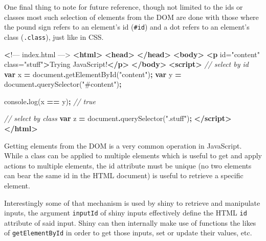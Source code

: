 \documentclass[
]{krantz}
\makeatletter
\newenvironment{Shaded}{\begin{snugshade}}{\end{snugshade}}
\newcommand{\BuiltInTok}[1]{#1}
\newcommand{\CommentTok}[1]{\textcolor[rgb]{0.37,0.37,0.37}{\textit{#1}}}
\newcommand{\ErrorTok}[1]{\textcolor[rgb]{0.14,0.14,0.14}{\textbf{#1}}}
\newcommand{\FunctionTok}[1]{\textcolor[rgb]{0,0,0}{#1}}
\newcommand{\KeywordTok}[1]{\textcolor[rgb]{0.27,0.27,0.27}{\textbf{#1}}}
\newcommand{\NormalTok}[1]{#1}
\newcommand{\OperatorTok}[1]{\textcolor[rgb]{0.43,0.43,0.43}{\textbf{#1}}}
\newcommand{\OtherTok}[1]{\textcolor[rgb]{0.37,0.37,0.37}{#1}}
\newcommand{\StringTok}[1]{\textcolor[rgb]{0.5,0.5,0.5}{#1}}
\newenvironment{kframe}{%
\medskip{}
\setlength{\fboxsep}{.8em}
 \def\at@end@of@kframe{}%
 \ifinner\ifhmode%
  \def\at@end@of@kframe{\end{minipage}}%
  \begin{minipage}{\columnwidth}%
 \fi\fi%
 \def\FrameCommand##1{\hskip\@totalleftmargin \hskip-\fboxsep
 \colorbox{shadecolor}{##1}\hskip-\fboxsep
     \hskip-\linewidth \hskip-\@totalleftmargin \hskip\columnwidth}%
 \MakeFramed {\advance\hsize-\width
   \@totalleftmargin\z@ \linewidth\hsize
   \@setminipage}}%
 {\par\unskip\endMakeFramed%
 \at@end@of@kframe}
\renewenvironment{Shaded}{\begin{kframe}}{\end{kframe}}
\makeatother
\begin{document}
One final thing to note for future reference, though not limited to the ids or classes most such selection of elements from the DOM are done with those where the pound sign refers to an element's id (\texttt{\#id}) and a dot refers to an element's class (\texttt{.class}), just like in CSS.

\begin{Shaded}
\begin{Highlighting}[]
 \ErrorTok{\textless{}}\NormalTok{!–– index.html ––\textgreater{}}
\KeywordTok{\textless{}html\textgreater{}}
  \KeywordTok{\textless{}head\textgreater{}}
  \KeywordTok{\textless{}/head\textgreater{}}
  \KeywordTok{\textless{}body\textgreater{}}
    \KeywordTok{\textless{}p}\OtherTok{ id=}\StringTok{"content"}\OtherTok{ class=}\StringTok{"stuff"}\KeywordTok{\textgreater{}}\NormalTok{Trying JavaScript!}\KeywordTok{\textless{}/p\textgreater{}}
  \KeywordTok{\textless{}/body\textgreater{}}
  \KeywordTok{\textless{}script\textgreater{}}
    \CommentTok{// select by id}
    \KeywordTok{var}\NormalTok{ x }\OperatorTok{=} \BuiltInTok{document}\OperatorTok{.}\FunctionTok{getElementById}\NormalTok{(}\StringTok{"content"}\NormalTok{)}\OperatorTok{;}
    \KeywordTok{var}\NormalTok{ y }\OperatorTok{=} \BuiltInTok{document}\OperatorTok{.}\FunctionTok{querySelector}\NormalTok{(}\StringTok{"\#content"}\NormalTok{)}\OperatorTok{;}

    \BuiltInTok{console}\OperatorTok{.}\FunctionTok{log}\NormalTok{(x }\OperatorTok{==}\NormalTok{ y)}\OperatorTok{;} \CommentTok{// true}

    \CommentTok{// select by class}
    \KeywordTok{var}\NormalTok{ z }\OperatorTok{=} \BuiltInTok{document}\OperatorTok{.}\FunctionTok{querySelector}\NormalTok{(}\StringTok{".stuff"}\NormalTok{)}\OperatorTok{;}
  \KeywordTok{\textless{}/script\textgreater{}}
\KeywordTok{\textless{}/html\textgreater{}}
\end{Highlighting}
\end{Shaded}

Getting elements from the DOM is a very common operation in JavaScript. While a class can be applied to multiple elements which is useful to get and apply actions to multiple elements, the id attribute must be unique (no two elements can bear the same id in the HTML document) is useful to retrieve a specific element.

Interestingly some of that mechanism is used by shiny to retrieve and manipulate inputs, the argument \texttt{inputId} of shiny inputs effectively define the HTML \texttt{id} attribute of said input. Shiny can then internally make use of functions the likes of \texttt{getElementById} in order to get those inputs, set or update their values, etc.
\end{document}
